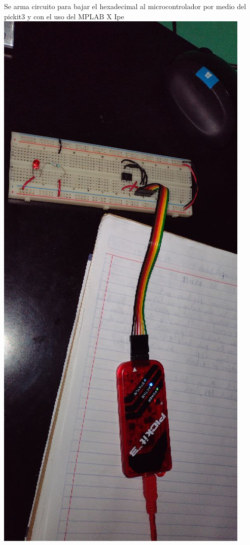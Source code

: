 \documentclass{article}
\begin{document}
Se arma circuito para bajar el hexadecimal al microcontrolador por medio del pickit3 y con el uso del MPLAB X Ipe\\
\includegraphics[scale=0.3]{pickit3}\\
\newline
\newline
\end{document}

